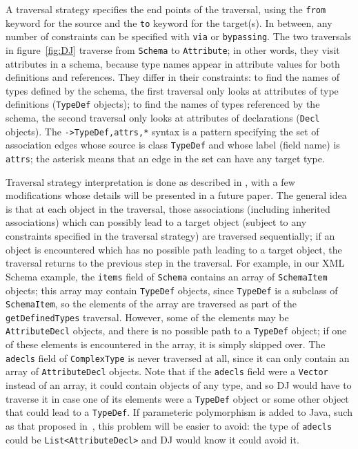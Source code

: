 \documentclass{llncs}
\newcommand{\code}[1]{\texttt{#1}}
\begin{document}
A traversal strategy specifies the end points of the traversal, using
the \code{from} keyword for the source and the \code{to}
keyword for the target(s).  In between, any number of constraints can be
specified with \code{via} or \code{bypassing}.  The two
traversals in figure~\ref{fig:DJ} traverse from \code{Schema} to
\code{Attribute}; in other words, they visit attributes in a schema,
because type names appear in attribute values for both definitions and
references.  They differ in their constraints: to find the names of
types defined by the schema, the first traversal only looks at
attributes of type definitions (\code{TypeDef} objects); to find the
names of types referenced by the schema, the second traversal only
looks at attributes of declarations (\code{Decl} objects).  The
\code{->TypeDef,attrs,*} syntax is a pattern specifying the set of
association edges whose source is class \code{TypeDef} and whose
label (field name) is \code{attrs}; the asterisk means that an edge in
the set can have any target type.

Traversal strategy interpretation is done as described in
\cite{strategies-tr:LP97}, with a few modifications whose details will
be presented in a future paper.  The general idea is that at each
object in the traversal, those associations (including inherited
associations) which can possibly lead to a target object (subject to
any constraints specified in the traversal strategy) are traversed
sequentially; if an object is encountered which has no possible path
leading to a target object, the traversal returns to the previous step
in the traversal.  For example, in our XML Schema example, the
\code{items} field of \code{Schema} contains an array of
\code{SchemaItem} objects; this array may contain \code{TypeDef}
objects, since \code{TypeDef} is a subclass of \code{SchemaItem}, so
the elements of the array are traversed as part of the
\code{getDefinedTypes} traversal.  However, some of the elements may
be \code{AttributeDecl} objects, and there is no possible path to a
\code{TypeDef} object; if one of these elements is encountered in the
array, it is simply skipped over.  The \code{adecls} field of
\code{ComplexType} is never traversed at all, since it can only
contain an array of \code{AttributeDecl} objects.  Note that if the
\code{adecls} field were a \code{Vector} instead of an array, it
could contain objects of any type, and so DJ would have to traverse it
in case one of its elements were a \code{TypeDef} object or some
other object that could lead to a \code{TypeDef}.  If parameteric
polymorphism is added to Java, such as that proposed in~\cite{GJ},
this problem will be easier to avoid: the type of \code{adecls} could
be \code{List<AttributeDecl>} and DJ would know it could avoid it.
\end{document}

